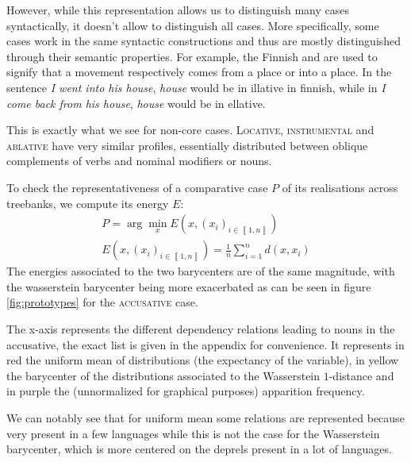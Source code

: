 However, while this representation allows us to distinguish many cases syntactically, it doesn't allow to distinguish all cases. 
More specifically, some cases work in the same syntactic constructions and thus are mostly distinguished through their semantic properties. 
For example, the Finnish  and  are used to signify that a movement respectively comes from a place or into a place. In the sentence \textsl{I went into his house}, \textsl{house} would be in illative in finnish, while in \textsl{I come back from his house}, \textsl{house} would be in ellative. 

This is exactly what we see for non-core cases.
\textsc{Locative}, \textsc{instrumental} and \textsc{ablative} have very similar profiles, essentially distributed between oblique complements of verbs and nominal modifiers or nouns.




To check the representativeness of a comparative case $P$ of its realisations across treebanks, we compute its energy $E$:
\begin{align}
    P = \arg\min_{x} E\left(x, \left(x_{i}\right)_{i \in \left\llbracket 1, n\right\rrbracket}\right) \\ 
    E\left(x, \left(x_{i}\right)_{i \in \left\llbracket 1, n\right\rrbracket}\right) = \frac{1}{n}\sum_{i = 1}^{n} d(x, x_{i})
\end{align}
The energies associated to the two barycenters are of the same magnitude, with the wasserstein barycenter being more exacerbated as can be seen in figure \ref{fig:prototypes} for the \textsc{accusative} case.

The x-axis represents the different dependency relations leading to nouns in the accusative, the exact list is given in the appendix for convenience. 
It represents in red the uniform mean of distributions (the expectancy of the variable), in yellow the barycenter of the distributions associated to the Wasserstein $1$-distance and in purple the (unnormalized for graphical purposes) apparition frequency. 

We can notably see that for uniform mean some relations are represented because very present in a few languages while this is not the case for the Wasserstein barycenter, which is more centered on the deprels present in a lot of languages. %

